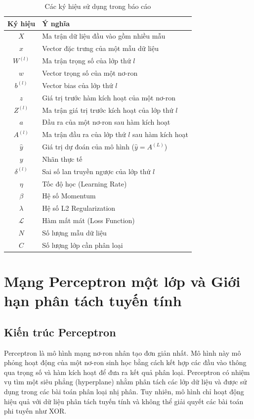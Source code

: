 \documentclass[12pt,a4paper]{report}
\begin{document}
\begin{table}[H]
\centering
\caption{Các ký hiệu sử dụng trong báo cáo}
\label{tab:symbols}
\renewcommand{\arraystretch}{1.3}
\begin{tabular}{cl}
\hline
\textbf{Ký hiệu} & \textbf{Ý nghĩa} \\ \hline
$X$ & Ma trận dữ liệu đầu vào gồm nhiều mẫu \\
$x$ & Vector đặc trưng của một mẫu dữ liệu \\
$W^{(l)}$ & Ma trận trọng số của lớp thứ $l$ \\
$w$ & Vector trọng số của một nơ-ron \\
$b^{(l)}$ & Vector bias của lớp thứ $l$ \\
$z$ & Giá trị trước hàm kích hoạt của một nơ-ron \\
$Z^{(l)}$ & Ma trận giá trị trước kích hoạt của lớp thứ $l$ \\
$a$ & Đầu ra của một nơ-ron sau hàm kích hoạt \\
$A^{(l)}$ & Ma trận đầu ra của lớp thứ $l$ sau hàm kích hoạt \\
$\hat{y}$ & Giá trị dự đoán của mô hình ($\hat{y} = A^{(L)}$) \\
$y$ & Nhãn thực tế \\
$\delta^{(l)}$ & Sai số lan truyền ngược của lớp thứ $l$ \\
$\eta$ & Tốc độ học (Learning Rate) \\
$\beta$ & Hệ số Momentum \\
$\lambda$ & Hệ số L2 Regularization \\
$\mathcal{L}$ & Hàm mất mát (Loss Function) \\
$N$ & Số lượng mẫu dữ liệu \\
$C$ & Số lượng lớp cần phân loại \\
\hline
\end{tabular}
\end{table}

\section{Mạng Perceptron một lớp và Giới hạn phân tách tuyến tính}
\subsection{Kiến trúc Perceptron}
Perceptron là mô hình mạng nơ-ron nhân tạo đơn giản nhất. Mô hình này mô phỏng hoạt động của một nơ-ron sinh học bằng cách kết hợp các đầu vào thông qua trọng số và hàm kích hoạt để đưa ra kết quả phân loại. Perceptron có nhiệm vụ tìm một siêu phẳng (hyperplane) nhằm phân tách các lớp dữ liệu và được sử dụng trong các bài toán phân loại nhị phân. Tuy nhiên, mô hình chỉ hoạt động hiệu quả với dữ liệu phân tách tuyến tính và không thể giải quyết các bài toán phi tuyến như XOR.
\end{document}
